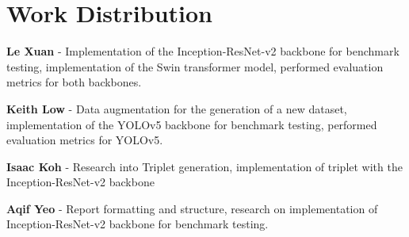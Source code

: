 \section{Work Distribution}

\textbf{Le Xuan} - Implementation of the Inception-ResNet-v2 backbone for benchmark testing, implementation of the Swin transformer model, performed evaluation metrics for both backbones.\par

\textbf{Keith Low} - Data augmentation for the generation of a new dataset, implementation of the YOLOv5 backbone for benchmark testing, performed evaluation metrics for YOLOv5.\par

\textbf{Isaac Koh} - Research into Triplet generation, implementation of triplet with the Inception-ResNet-v2 backbone \par

\textbf{Aqif Yeo} - Report formatting and structure, research on implementation of Inception-ResNet-v2 backbone for benchmark testing. \par